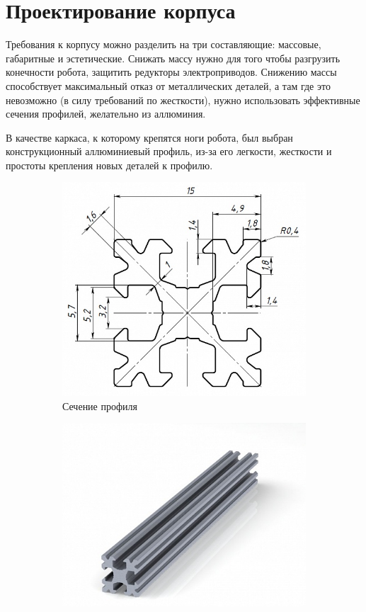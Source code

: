 \section{Проектирование корпуса}
Требования к корпусу можно разделить на три составляющие: массовые, габаритные и эстетические. Снижать массу нужно для того чтобы разгрузить конечности робота, защитить редукторы электроприводов. Снижению массы способствует максимальный отказ от металлических деталей, а там где это невозможно (в силу требований по жесткости), нужно использовать эффективные сечения профилей, желательно из аллюминия.

В качестве каркаса, к которому крепятся ноги робота, был выбран конструкционный аллюминиевый профиль, из-за его легкости, жесткости и простоты крепления новых деталей к профилю.
\begin{figure}[ht]
    \centering
    \begin{subfigure}[b]{0.45\textwidth}    
        \centering
        \includegraphics[scale=0.75]{chapter_mechanics_construction/figure8.png}
        \caption{Сечение профиля}
    \end{subfigure}
    \begin{subfigure}[b]{0.45\textwidth}
        \centering
        \includegraphics[scale=0.9]{chapter_mechanics_construction/figure9.png}

\end{subfigure}
\end{figure}
